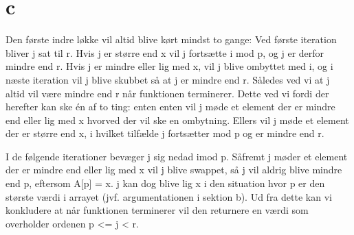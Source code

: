 \section{c}
Den første indre løkke vil altid blive kørt mindst to gange: Ved første iteration bliver j sat til r. Hvis j er større end x vil j fortsætte i mod p, og j er derfor mindre end r. Hvis j er mindre eller lig med x, vil j blive ombyttet med i, og i næste iteration vil j blive skubbet så at j er mindre end r. 
 Således ved vi at j altid vil være mindre end r når funktionen terminerer. Dette ved vi fordi der herefter kan ske én af to ting: enten enten vil j møde et element der er mindre end eller lig med x hvorved der vil ske en ombytning. Ellers vil j møde et element der er større end x, i hvilket tilfælde j fortsætter mod p og er mindre end r. 

I de følgende iterationer bevæger j sig nedad imod p. Såfremt j møder et element der er mindre end eller lig med x vil j blive swappet, så j vil aldrig blive mindre end p, eftersom A[p] = x. j kan dog blive lig x i den situation hvor p er den største værdi i arrayet (jvf. argumentationen i sektion b). Ud fra dette kan vi konkludere at når funktionen terminerer vil den returnere en værdi som overholder ordenen p <= j < r. 






